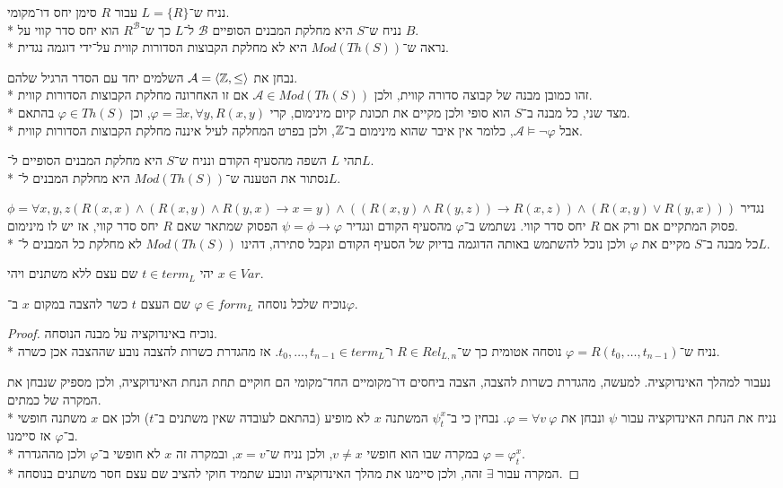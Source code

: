 \subquestion{}
נניח ש־$L = \{ R \}$ עבור $R$ סימן יחס דו־מקומי. \\*
נניח ש־$S$ היא מחלקת המבנים הסופיים $\mathcal{B}$ ל־$L$ כך ש־$R^\mathcal{B}$ הוא יחס סדר קווי על $B$. \\*
נראה ש־$Mod(Th(S))$ היא לא מחלקת הקבוצות הסדורות קווית על־ידי דוגמה נגדית.
\begin{solution}
	נבחן את $\mathcal{A} = \langle \mathbb{Z}, \le \rangle$ השלמים יחד עם הסדר הרגיל שלהם. \\*
	זהו כמובן מבנה של קבוצה סדורה קווית, ולכן $\mathcal{A} \in Mod(Th(S))$ אם זו האחרונה מחלקת הקבוצות הסדורות קווית. \\*
	מצד שני, כל מבנה ב־$S$ הוא סופי ולכן מקיים את תכונת קיום מינימום, קרי $\varphi = \exists x, \forall y, R(x, y)$, וכן $\varphi \in Th(S)$ בהתאם. \\*
	אבל $\mathcal{A} \models \lnot \varphi$, כלומר אין איבר שהוא מינימום ב־$\mathbb{Z}$, ולכן בפרט המחלקה לעיל איננה מחלקת הקבוצות הסדורות קווית.
\end{solution}

\subquestion{}
תהי $L$ השפה מהסעיף הקודם ונניח ש־$S$ היא מחלקת המבנים הסופיים ל־$L$. \\*
נסתור את הטענה ש־$Mod(Th(S))$ היא מחלקת המבנים ל־$L$.
\begin{solution}
	נגדיר $\phi = \forall x, y, z (R(x, x) \land (R(x, y) \land R(y, x) \to x = y) \land ((R(x, y) \land R(y, z)) \to R(x, z)) \land (R(x, y) \lor R(y, x)))$ פסוק המתקיים אם ורק אם $R$ יחס סדר קווי.
	נשתמש ב־$\varphi$ מהסעיף הקודם ונגדיר $\psi = \phi \to \varphi$ הפסוק שמתאר שאם $R$ יחס סדר קווי, אז יש לו מינימום. \\*
	כל מבנה ב־$S$ מקיים את $\varphi$ ולכן נוכל להשתמש באותה הדוגמה בדיוק של הסעיף הקודם ונקבל סתירה, דהינו $Mod(Th(S))$ לא מחלקת כל המבנים ל־$L$.
\end{solution}

\question{}
יהי $t \in term_L$ שם עצם ללא משתנים ויהי $x \in Var$.

\subquestion{}
נוכיח שלכל נוסחה $\varphi \in form_L$ שם העצם $t$ כשר להצבה במקום $x$ ב־$\varphi$.
\begin{proof}
	נוכיח באינדוקציה על מבנה הנוסחה. \\*
	נניח ש־$\varphi = R(t_0, \dots, t_{n - 1})$ נוסחה אטומית כך ש־$R \in Rel_{L, n}$ ו־$t_0, \dots, t_{n - 1} \in term_L$.
	אז מהגדרת כשרות להצבה נובע שההצבה אכן כשרה.

	נעבור למהלך האינדוקציה.
	למעשה, מהגדרת כשרות להצבה, הצבה ביחסים דו־מקומיים החד־מקומי הם חוקיים תחת הנחת האינדוקציה, ולכן מספיק שנבחן את המקרה של כמתים. \\*
	נניח את הנחת האינדוקציה עבור $\psi$ ונבחן את $\varphi = \forall v\ \varphi$.
	נבחין כי ב־$\psi_t^x$ המשתנה $x$ לא מופיע (בהתאם לעובדה שאין משתנים ב־$t$) ולכן אם $x$ משתנה חופשי ב־$\varphi$ אז סיימנו. \\*
	במקרה שבו הוא חופשי $v \ne x$, ולכן נניח ש־$x = v$, ובמקרה זה $x$ לא חופשי ב־$\varphi$ ולכן מההגדרה $\varphi = \varphi_t^x$. \\*
	המקרה עבור $\exists$ זהה, ולכן סיימנו את מהלך האינדוקציה ונובע שתמיד חוקי להציב שם עצם חסר משתנים בנוסחה.
\end{proof}

